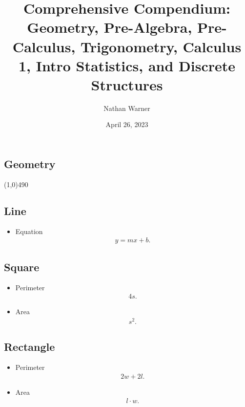\documentclass{report}
\title{\Huge{Comprehensive Compendium: Geometry, Pre-Algebra, Pre-Calculus, Trigonometry, Calculus 1, Intro Statistics, and Discrete Structures}}
\author{\huge{Nathan Warner}}
\date{\huge{April 26, 2023}}
\begin{document}
    \maketitle
    \tableofcontents
    \pagebreak \bigbreak \noindent

    \bigbreak \noindent 
    \begin{center}
      \section{Geometry}
    \end{center}
    \line(1,0){490}
    \bigbreak \noindent \bigbreak \noindent 
    \subsection{Line}
    \begin{itemize}
      \item Equation
        \begin{align*}
          y=mx+b
        .\end{align*}
    \end{itemize}
    \bigbreak \noindent \bigbreak \noindent 
    \subsection{Square}
    \begin{itemize}
      \item Perimeter
        \begin{align*}
          4s
        .\end{align*}
      \item Area
        \begin{align*}
          s^{2}
        .\end{align*}
    \end{itemize}

    \bigbreak \noindent \bigbreak \noindent 
    \subsection{Rectangle}
    \begin{itemize}
      \item Perimeter
        \begin{align*}
          2w + 2l
        .\end{align*}
      \item Area
        \begin{align*}
          l \cdot w
        .\end{align*}
    \end{itemize}
\end{document}
